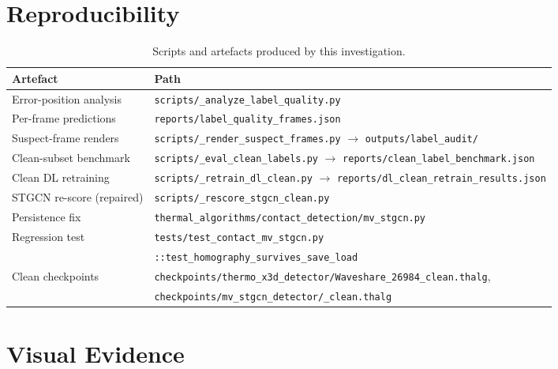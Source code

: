 \documentclass[11pt, a4paper]{article}
\begin{document}
\appendix
\section{Reproducibility}

\begin{table}[H]
\centering
\footnotesize
\begin{tabular}{ll}
\toprule
Artefact & Path \\
\midrule
Error-position analysis      & \texttt{scripts/\_analyze\_label\_quality.py} \\
Per-frame predictions        & \texttt{reports/label\_quality\_frames.json} \\
Suspect-frame renders        & \texttt{scripts/\_render\_suspect\_frames.py} $\rightarrow$ \texttt{outputs/label\_audit/} \\
Clean-subset benchmark       & \texttt{scripts/\_eval\_clean\_labels.py} $\rightarrow$ \texttt{reports/clean\_label\_benchmark.json} \\
Clean DL retraining          & \texttt{scripts/\_retrain\_dl\_clean.py} $\rightarrow$ \texttt{reports/dl\_clean\_retrain\_results.json} \\
STGCN re-score (repaired)    & \texttt{scripts/\_rescore\_stgcn\_clean.py} \\
Persistence fix              & \texttt{thermal\_algorithms/contact\_detection/mv\_stgcn.py} \\
Regression test              & \texttt{tests/test\_contact\_mv\_stgcn.py} \\
                             & \quad\texttt{::test\_homography\_survives\_save\_load} \\
Clean checkpoints            & \texttt{checkpoints/thermo\_x3d\_detector/Waveshare\_26984\_clean.thalg}, \\
                             & \texttt{checkpoints/mv\_stgcn\_detector/\_clean.thalg} \\
\bottomrule
\end{tabular}
\caption{Scripts and artefacts produced by this investigation.}
\end{table}

\section{Visual Evidence}
\end{document}

